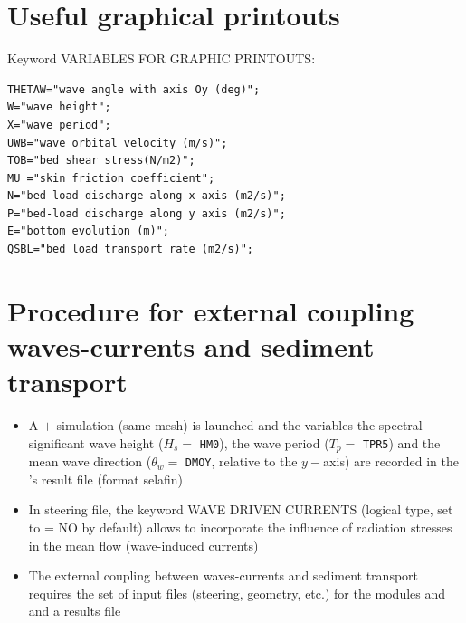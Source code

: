 \section{Useful graphical printouts}
Keyword {\ttfamily VARIABLES FOR GRAPHIC PRINTOUTS}:
\begin{lstlisting}[frame=trBL]  
THETAW="wave angle with axis Oy (deg)";
W="wave height";
X="wave period";
UWB="wave orbital velocity (m/s)";
TOB="bed shear stress(N/m2)";
MU ="skin friction coefficient";
N="bed-load discharge along x axis (m2/s)";
P="bed-load discharge along y axis (m2/s)";
E="bottom evolution (m)";
QSBL="bed load transport rate (m2/s)";
\end{lstlisting}

\section{Procedure for external coupling waves-currents and sediment transport}
\begin{itemize}
\item A  $+$ \tomawac{} simulation (same mesh) is launched and the variables the spectral significant wave height ($H_s =$ \texttt{HM0}), the wave period ($T_p =$ \texttt{TPR5}) and the mean wave direction ($\theta_w =$ \texttt{DMOY}, relative to the $y-$axis) are recorded in the \tomawac{}'s result file (format selafin)

\item In  steering file, the keyword {\ttfamily WAVE DRIVEN CURRENTS} (logical type, set to {\ttfamily = NO} by default) allows to incorporate the influence of radiation stresses in the mean flow (wave-induced currents)

\item The external coupling between waves-currents and sediment transport requires the set of input files (steering, geometry, etc.) for the modules  and \sisyphe{} and a results file \tomawac{} 



\end{itemize}

